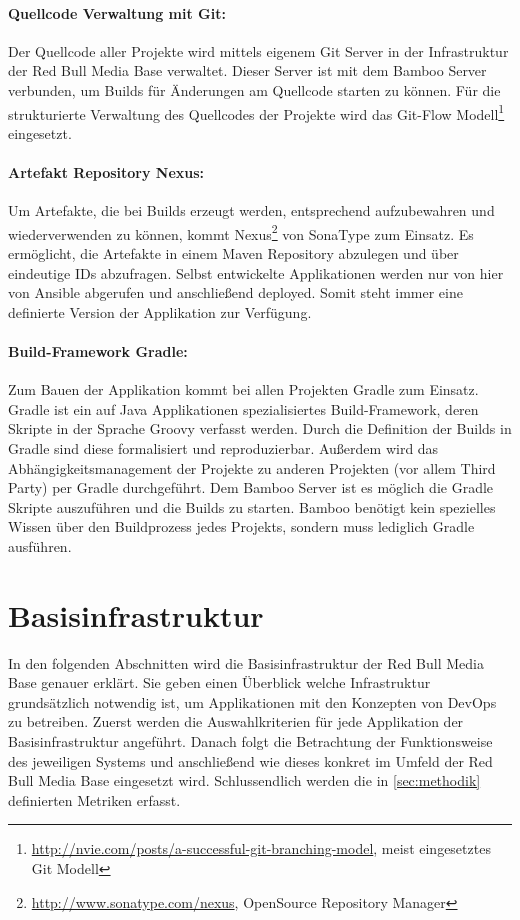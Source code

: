 \paragraph{Quellcode Verwaltung mit Git:}
Der Quellcode aller Projekte wird mittels eigenem Git Server in der Infrastruktur der Red Bull Media Base verwaltet. Dieser Server ist mit dem Bamboo Server verbunden, um Builds für Änderungen am Quellcode starten zu können. Für die strukturierte Verwaltung des Quellcodes der Projekte wird das Git-Flow Modell\footnote{\url{http://nvie.com/posts/a-successful-git-branching-model}, meist eingesetztes Git Modell} eingesetzt.

\paragraph{Artefakt Repository Nexus:}
Um Artefakte, die bei Builds erzeugt werden, entsprechend aufzubewahren und wiederverwenden zu können, kommt Nexus\footnote{\url{http://www.sonatype.com/nexus}, OpenSource Repository Manager} von SonaType zum Einsatz. Es ermöglicht, die Artefakte in einem Maven Repository abzulegen und über eindeutige IDs abzufragen. Selbst entwickelte Applikationen werden nur von hier von Ansible abgerufen und anschließend deployed. Somit steht immer eine definierte Version der Applikation zur Verfügung.

\paragraph{Build-Framework Gradle:}
Zum Bauen der Applikation kommt bei allen Projekten Gradle zum Einsatz. Gradle ist ein auf Java Applikationen spezialisiertes Build-Framework, deren Skripte in der Sprache Groovy verfasst werden. Durch die Definition der Builds in Gradle sind diese formalisiert und reproduzierbar. Außerdem wird das Abhängigkeitsmanagement der Projekte zu anderen Projekten (vor allem Third Party) per Gradle durchgeführt. Dem Bamboo Server ist es möglich die Gradle Skripte auszuführen und die Builds zu starten. Bamboo benötigt kein spezielles Wissen über den Buildprozess jedes Projekts, sondern muss lediglich Gradle ausführen.

\section{Basisinfrastruktur}
\label{sec:basisinfrastruktur}
In den folgenden Abschnitten wird die Basisinfrastruktur der Red Bull Media Base genauer erklärt. Sie geben einen Überblick welche Infrastruktur grundsätzlich notwendig ist, um Applikationen mit den Konzepten von DevOps zu betreiben. Zuerst werden die Auswahlkriterien für jede Applikation der Basisinfrastruktur angeführt. Danach folgt die Betrachtung der Funktionsweise des jeweiligen Systems und anschließend wie dieses konkret im Umfeld der Red Bull Media Base eingesetzt wird. Schlussendlich werden die in \autoref{sec:methodik} definierten Metriken erfasst. 

